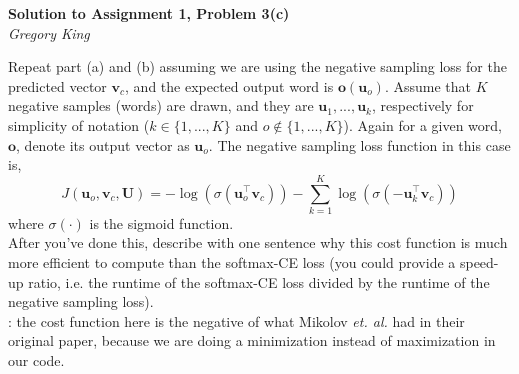 \documentclass[letter,12pt]{article}
\newcommand{\myhwtitle}[3]
{\begin{center}
{\large {\bf Solution to Assignment {#1}, Problem {#2}}}\\
\medskip
{\it {#3}} %
\end{center}}
\newcommand{\solutionsAuthor}{Gregory King}
\begin{document}
\myhwtitle{1}{3(c)}{\solutionsAuthor}
\bigskip
\noindent Repeat part (a) and (b) assuming we are using the negative sampling loss for the predicted vector ${\boldsymbol v}_{c}$, and
the expected output word is ${\boldsymbol o}({\boldsymbol u}_{o})$. Assume that $K$ negative samples (words) are drawn, and they are ${\boldsymbol u}_{1},...,{\boldsymbol u}_{k}$, respectively for simplicity of notation ($k\in\{1,...,K\}$ and $o\notin\{1,...,K\}$). Again for a given word, ${\boldsymbol o}$, denote its output vector as ${\boldsymbol u}_{o}$. The negative sampling loss function in this case is,
\begin{equation}
J({\boldsymbol u}_{o}, {\boldsymbol v}_{c}, {\boldsymbol U}) = -\log(\sigma( {\boldsymbol u}^{\top}_{o}{\boldsymbol v}_{c})) - \sum^{K}_{k=1}\log(\sigma(- {\boldsymbol u}^{\top}_{k}{\boldsymbol v}_{c}))
\end{equation}
where $\sigma(\cdot)$ is the sigmoid function.\\

\noindent After you've done this, describe with one sentence why this cost function is much more efficient to
compute than the softmax-CE loss (you could provide a speed-up ratio, i.e. the runtime of the softmax-CE loss divided by the
runtime of the negative sampling loss).\\

: the cost function here is the negative of what Mikolov \textit{et. al.} had in their original paper,
because we are doing a minimization instead of maximization in our code.\vspace{5mm}
\end{document}
